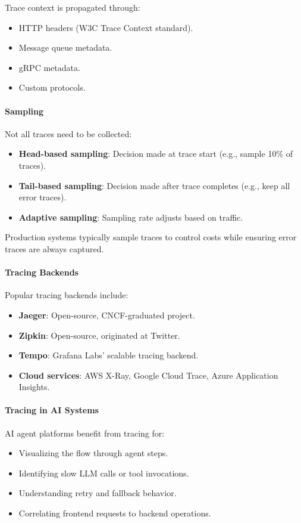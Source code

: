\documentclass[a4paper,twoside]{sapthesis}
\begin{document}
Trace context is propagated through:
\begin{itemize}
    \item HTTP headers (W3C Trace Context standard).
    \item Message queue metadata.
    \item gRPC metadata.
    \item Custom protocols.
\end{itemize}

\paragraph{Sampling}

Not all traces need to be collected:
\begin{itemize}
    \item \textbf{Head-based sampling}: Decision made at trace start (e.g., sample 10\% of traces).
    \item \textbf{Tail-based sampling}: Decision made after trace completes (e.g., keep all error traces).
    \item \textbf{Adaptive sampling}: Sampling rate adjusts based on traffic.
\end{itemize}

Production systems typically sample traces to control costs while ensuring error traces are always captured.

\paragraph{Tracing Backends}

Popular tracing backends include:
\begin{itemize}
    \item \textbf{Jaeger}: Open-source, CNCF-graduated project.
    \item \textbf{Zipkin}: Open-source, originated at Twitter.
    \item \textbf{Tempo}: Grafana Labs' scalable tracing backend.
    \item \textbf{Cloud services}: AWS X-Ray, Google Cloud Trace, Azure Application Insights.
\end{itemize}

\paragraph{Tracing in AI Systems}

AI agent platforms benefit from tracing for:
\begin{itemize}
    \item Visualizing the flow through agent steps.
    \item Identifying slow LLM calls or tool invocations.
    \item Understanding retry and fallback behavior.
    \item Correlating frontend requests to backend operations.
\end{itemize}
\end{document}
